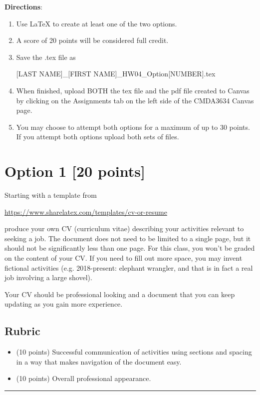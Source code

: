 
\noindent \textbf{Directions}: 

\begin{enumerate}
\item Use \LaTeX{} to create at least one of the two options. 
\item A score of 20 points will be considered full credit.

\item Save the .tex file as 
\begin{center}
[LAST NAME]\_[FIRST NAME]\_HW04\_Option[NUMBER].tex
\end{center} 
\item When finished, upload BOTH the tex file and the pdf file created to Canvas by clicking on the Assignments tab on the left side of the CMDA3634 Canvas page.
\item You may choose to attempt both options for a maximum of up to 30 points. If you attempt both options upload both sets of files.
\end{enumerate}

\newpage
\section*{Option 1 [20 points]}
Starting with a template from
\begin{center}
\url{https://www.sharelatex.com/templates/cv-or-resume}
\end{center}
produce your own CV (curriculum vitae) describing your activities relevant to seeking a job.
The document does not need to be limited to a single page,
but it should not be significantly less than one page.
For this class, you won't be graded on the content of your CV.
If you need to fill out more space, you may invent fictional activities (e.g. 2018-present: elephant wrangler, and that is in fact a real job involving a large shovel).

Your CV should be professional looking and a document that you can keep updating as you gain more experience.

\subsection*{Rubric}
\begin{itemize}
    \item (10 points) Successful communication of activities using sections and spacing in a way that makes navigation of the document easy.
    \item (10 points) Overall professional appearance.
\end{itemize}
\begin{center}\rule{0.8\textwidth}{.4pt}\end{center}


